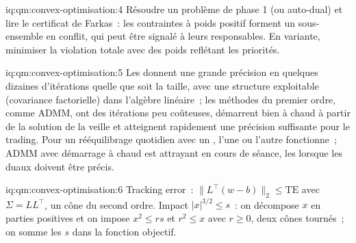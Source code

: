 \begin{solution}{iq:qm:convex-optimisation:4}
Résoudre un problème de phase 1 (ou auto-dual) et lire le certificat de Farkas~: les contraintes à poids positif forment un sous-ensemble en conflit, qui peut être signalé à leurs responsables. En variante,
minimiser la violation totale avec des poids reflétant les priorités.
\end{solution}

\begin{solution}{iq:qm:convex-optimisation:5}
Les  donnent une grande précision en quelques dizaines d'itérations quelle que soit la taille, avec une structure exploitable (covariance factorielle) dans l'algèbre linéaire~; les méthodes du premier ordre, comme ADMM, ont
des itérations peu coûteuses, démarrent bien à chaud à partir de la solution de la veille et atteignent rapidement une précision suffisante pour le trading. Pour un rééquilibrage quotidien avec un , l'une ou l'autre fonctionne~; ADMM avec démarrage à chaud est attrayant
en cours de séance, les  lorsque les duaux doivent être précis.
\end{solution}

\begin{solution}{iq:qm:convex-optimisation:6}
Tracking error~: $\lVert L^\top(w - b)\rVert_2 \le \mathrm{TE}$ avec $\Sigma = LL^\top$, un cône du second ordre. Impact $|x|^{3/2} \le s$~: on décompose $x$ en parties positives et on impose $x^2 \le rs$ et $r^2 \le x$ avec
$r \ge 0$, deux cônes tournés~; on somme les $s$ dans la fonction objectif.
\end{solution}
